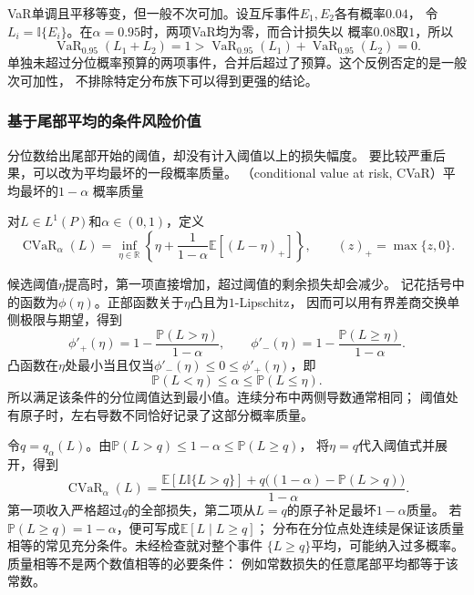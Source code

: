 VaR单调且平移等变，但一般不次可加。设互斥事件$E_1,E_2$各有概率$0.04$，
令$L_i=\mathbb I\{E_i\}$。在$\alpha=0.95$时，两项VaR均为零，而合计损失以
概率$0.08$取$1$，所以
\[
  \operatorname{VaR}_{0.95}(L_1+L_2)=1
  >\operatorname{VaR}_{0.95}(L_1)+\operatorname{VaR}_{0.95}(L_2)=0.
\]
单独未超过分位概率预算的两项事件，合并后超过了预算。这个反例否定的是一般次可加性，
不排除特定分布族下可以得到更强的结论。

\subsubsection{基于尾部平均的条件风险价值}

分位数给出尾部开始的阈值，却没有计入阈值以上的损失幅度。
要比较严重后果，可以改为平均最坏的一段概率质量。
（conditional value at risk, CVaR）平均最坏的$1-\alpha$
概率质量
\begin{definition}[条件风险价值]
\label{def:decision-conditional-value-at-risk}
对$L\in L^1(P)$和$\alpha\in(0,1)$，定义
\begin{equation}
  \operatorname{CVaR}_\alpha(L)
  =\inf_{\eta\in\mathbb R}
    \left\{\eta+\frac{1}{1-\alpha}\mathbb E[(L-\eta)_+]\right\},
  \qquad (z)_+=\max\{z,0\}.
  \label{eq:decision-cvar-optimization}
\end{equation}
\end{definition}
候选阈值$\eta$提高时，第一项直接增加，超过阈值的剩余损失却会减少。
记花括号中的函数为$\phi(\eta)$。正部函数关于$\eta$凸且为$1$-Lipschitz，
因而可以用有界差商交换单侧极限与期望，得到
\[
  \phi'_+(\eta)=1-\frac{\mathbb P(L>\eta)}{1-\alpha},\qquad
  \phi'_-(\eta)=1-\frac{\mathbb P(L\geq\eta)}{1-\alpha}.
\]
凸函数在$\eta$处最小当且仅当$\phi'_-(\eta)\leq0\leq\phi'_+(\eta)$，即
\begin{equation}
  \mathbb P(L<\eta)\leq\alpha\leq\mathbb P(L\leq\eta).
  \label{eq:decision-cvar-quantile-condition}
\end{equation}
所以满足该条件的分位阈值达到最小值。连续分布中两侧导数通常相同；
阈值处有原子时，左右导数不同恰好记录了这部分概率质量。

令$q=q_\alpha(L)$。由$\mathbb P(L>q)\leq1-\alpha\leq\mathbb P(L\geq q)$，
将$\eta=q$代入阈值式并展开，得到
\begin{equation}
  \operatorname{CVaR}_\alpha(L)=
  \frac{\mathbb E[L\mathbb I\{L>q\}]
    +q\bigl((1-\alpha)-\mathbb P(L>q)\bigr)}{1-\alpha}.
  \label{eq:decision-cvar-atomic-tail}
\end{equation}
第一项收入严格超过$q$的全部损失，第二项从$L=q$的原子补足最坏$1-\alpha$质量。
若$\mathbb P(L\geq q)=1-\alpha$，便可写成$\mathbb E[L\mid L\geq q]$；
分布在分位点处连续是保证该质量相等的常见充分条件。未经检查就对整个事件
$\{L\geq q\}$平均，可能纳入过多概率。质量相等不是两个数值相等的必要条件：
例如常数损失的任意尾部平均都等于该常数。

